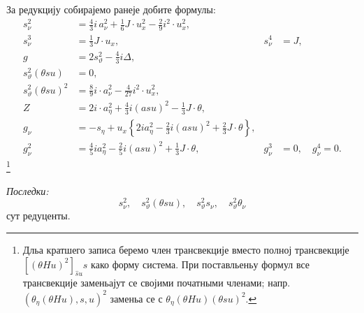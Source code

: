 ﻿\documentclass[11pt]{article}
\begin{document}
За редукцију собирајемо ранеје добите формулы:
\[
\tag{24}
\begin{aligned}
s_{\nu}^2&=\frac43i\,a_{\nu}^2+\frac16J\cdot u_x^2-\frac29i^2\cdot u_x^2,\\
s_{\nu}^3&=\frac13J\cdot u_x,
& s_{\nu}^4&=J,\\
g&=2s_\vartheta^2-\frac43i\Delta,\\
s_\vartheta^2(\theta su)&=0,\\
s_\vartheta^2(\theta su)^2&=\frac89i\cdot a_{\nu}^2-\frac4{27}i^2\cdot u_x^2,\\
Z&=2i\cdot a_\eta^2+\frac43i(asu)^2-\frac13J\cdot\theta,\\
g_{\nu}&=-s_\eta+u_x\left\{2ia_\eta^2-\frac23i(asu)^2+\frac23J\cdot\theta\right\},\\
g_{\nu}^2&=\frac45ia_\eta^2-\frac25i(asu)^2+\frac13J\cdot\theta,
&g_{\nu}^3&=0,\quad g_{\nu}^4=0.
\end{aligned}
\]
\footnote{Дльа кратшего записа беремо член трансвекције вместо полној трансвекције $[(\theta Hu)^2]_{\widehat{s}u}s$ како форму система. При поставльеньу формул все трансвекције заменьајут се својими початными членами; напр. $(\theta_\eta(\theta Hu),s,u)^2$ заменьа се с $\theta_\eta(\theta Hu)(\theta su)^2$.}

\noindent\textit{Последки:}
\[
 s_{\nu}^2,\quad s_\vartheta^2(\theta su),\quad s_\vartheta^2s_{\nu},\quad s_\vartheta^2\theta_{\nu}
\]
сут редуценты.
\end{document}
